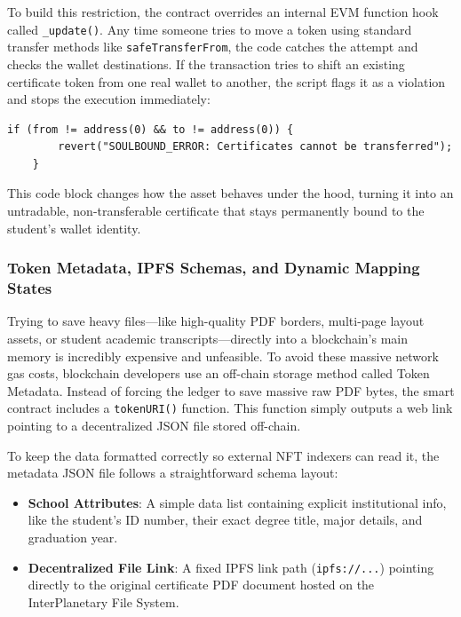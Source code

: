 To build this restriction, the contract overrides an internal EVM function hook called \texttt{\_update()}\cite{openzeppelin2026erc721}. Any time someone tries to move a token using standard transfer methods like \texttt{safeTransferFrom}, the code catches the attempt and checks the wallet destinations\cite{nfterc721web}\cite{openzeppelin2026erc721}. If the transaction tries to shift an existing certificate token from one real wallet to another, the script flags it as a violation and stops the execution immediately:

\begin{lstlisting}[language=solidity,style=codeStyle]
    if (from != address(0) && to != address(0)) {
        revert("SOULBOUND_ERROR: Certificates cannot be transferred");
    }
\end{lstlisting}

This code block changes how the asset behaves under the hood, turning it into an untradable, non-transferable certificate that stays permanently bound to the student's wallet identity\cite{nfterc721web}\cite{ahsan2025shikkachain}.

\subsubsection{Token Metadata, IPFS Schemas, and Dynamic Mapping States}

Trying to save heavy files—like high-quality PDF borders, multi-page layout assets, or student academic transcripts—directly into a blockchain's main memory is incredibly expensive and unfeasible\cite{wood2008EthereumYellowPaper}. To avoid these massive network gas costs, blockchain developers use an off-chain storage method called Token Metadata\cite{nfterc721web}\cite{william2018eip721}. Instead of forcing the ledger to save massive raw PDF bytes, the smart contract includes a \texttt{tokenURI()} function. This function simply outputs a web link pointing to a decentralized JSON file stored off-chain\cite{william2018eip721}\cite{openzeppelin2026erc721}.



To keep the data formatted correctly so external NFT indexers can read it, the metadata JSON file follows a straightforward schema layout\cite{william2018eip721}:

\begin{itemize}
    \item \textbf{School Attributes}: A simple data list containing explicit institutional info, like the student's ID number, their exact degree title, major details, and graduation year.

    \item \textbf{Decentralized File Link}: A fixed IPFS link path (\texttt{ipfs://...}) pointing directly to the original certificate PDF document hosted on the InterPlanetary File System\cite{benet2014ipfs}.
\end{itemize}

